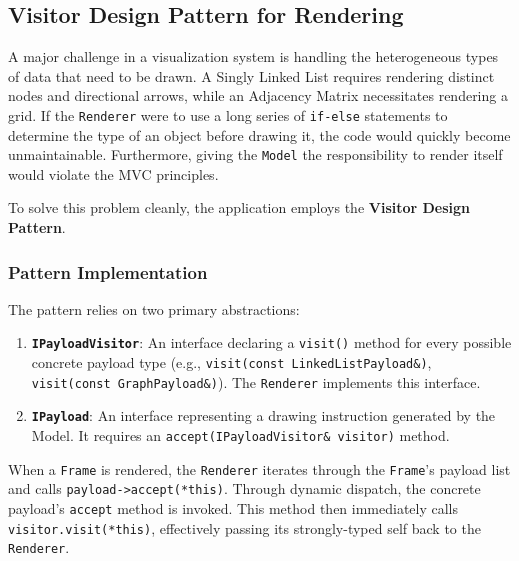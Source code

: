 \subsection{Visitor Design Pattern for Rendering}

A major challenge in a visualization system is handling the heterogeneous types of data that need to be drawn. A Singly Linked List requires rendering distinct nodes and directional arrows, while an Adjacency Matrix necessitates rendering a grid. If the \texttt{Renderer} were to use a long series of \texttt{if-else} statements to determine the type of an object before drawing it, the code would quickly become unmaintainable. Furthermore, giving the \texttt{Model} the responsibility to render itself would violate the MVC principles.

To solve this problem cleanly, the application employs the \textbf{Visitor Design Pattern}. 

\subsubsection{Pattern Implementation}
The pattern relies on two primary abstractions:
\begin{enumerate}
    \item \textbf{\texttt{IPayloadVisitor}}: An interface declaring a \texttt{visit()} method for every possible concrete payload type (e.g., \texttt{visit(const LinkedListPayload\&)}, \texttt{visit(const GraphPayload\&)}). The \texttt{Renderer} implements this interface.
    \item \textbf{\texttt{IPayload}}: An interface representing a drawing instruction generated by the Model. It requires an \texttt{accept(IPayloadVisitor\& visitor)} method.
\end{enumerate}

When a \texttt{Frame} is rendered, the \texttt{Renderer} iterates through the \texttt{Frame}'s payload list and calls \texttt{payload->accept(*this)}. Through dynamic dispatch, the concrete payload's \texttt{accept} method is invoked. This method then immediately calls \texttt{visitor.visit(*this)}, effectively passing its strongly-typed self back to the \texttt{Renderer}.

